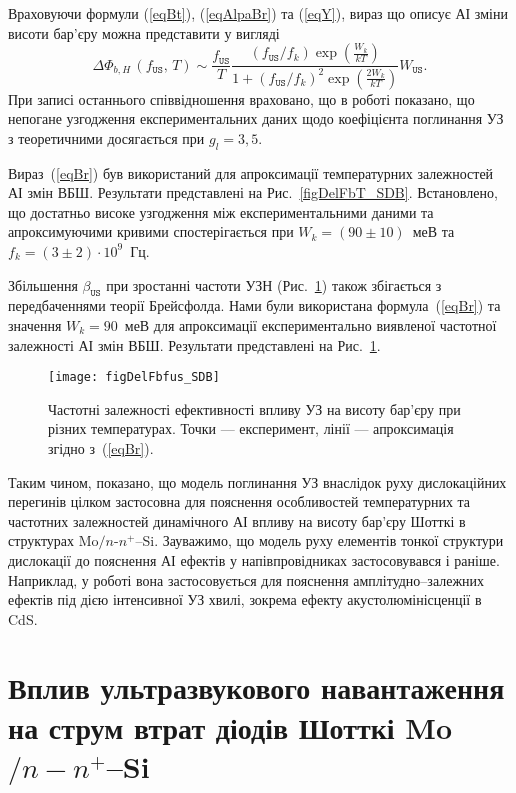 Враховуючи формули (\ref{eqBt}), (\ref{eqAlpaBr}) та (\ref{eqY}),
вираз що описує АІ зміни висоти бар'єру можна представити у вигляді
\begin{equation}
\label{eqBr}
\Delta\Phi_{b,H}\,(f_\mathtt{US},\,T)\sim\frac{f_\mathtt{US}}{T}\frac{(f_\mathtt{US}/{f_k})\exp\left(\frac{W_k}{kT}\right)}
{1+(f_\mathtt{US}/{f_k})^2\exp\left(\frac{2W_k}{kT}\right)}W_\mathtt{US}.
\end{equation}
При записі останнього співвідношення враховано, що
в роботі \cite{Olikh:UPJ2014} показано, що непогане узгодження експериментальних даних щодо коефіцієнта поглинання УЗ з теоретичними
досягається при $g_l=3,5$.



Вираз~(\ref{eqBr}) був використаний для апроксимації температурних залежностей АІ змін ВБШ.
Результати представлені на Рис.~\ref{figDelFbT_SDB}.
Встановлено, що достатньо високе узгодження між експериментальними даними та апроксимуючими кривими спостерігається
при  $W_k=(90\pm10)$~меВ та $f_k=(3\pm2)\cdot10^9$~Гц.

Збільшення $\beta_\mathtt{US}$ при зростанні частоти УЗН (Рис.~\ref{figDelFbfus_SDB}) також збігається
з передбаченнями теорії Брейсфолда.
Нами були використана формула~(\ref{eqBr}) та значення $W_k=90$~меВ для апроксимації експериментально виявленої частотної залежності АІ змін ВБШ.
Результати представлені на Рис.~\ref{figDelFbfus_SDB}.


\begin{figure}
\center
\texttt{[image: figDelFbfus\_SDB]}
\caption{\label{figDelFbfus_SDB}
Частотні залежності ефективності впливу УЗ на висоту бар'єру при різних температурах.
Точки --- експеримент,
лінії --- апроксимація згідно з~(\ref{eqBr}).
}%
\end{figure}


Таким чином, показано, що модель поглинання УЗ внаслідок руху дислокаційних перегинів цілком застосовна
для пояснення особливостей температурних та частотних залежностей динамічного АІ впливу на висоту бар'єру Шотткі в структурах Mo$/n$-$n^+$--Si.
Зауважимо, що модель руху елементів тонкої структури дислокації до
пояснення АІ ефектів у напівпровідниках застосовувався і раніше.
Наприклад, у роботі \cite{Loktev} вона застосовується для пояснення амплітудно--залежних ефектів
під дією інтенсивної УЗ хвилі, зокрема ефекту акустолюмінісценції в CdS.


\section{Вплив ультразвукового навантаження на струм втрат діодів Шотткі Mo$/n-n^+$--Si\label{SSDB:Rev}}

